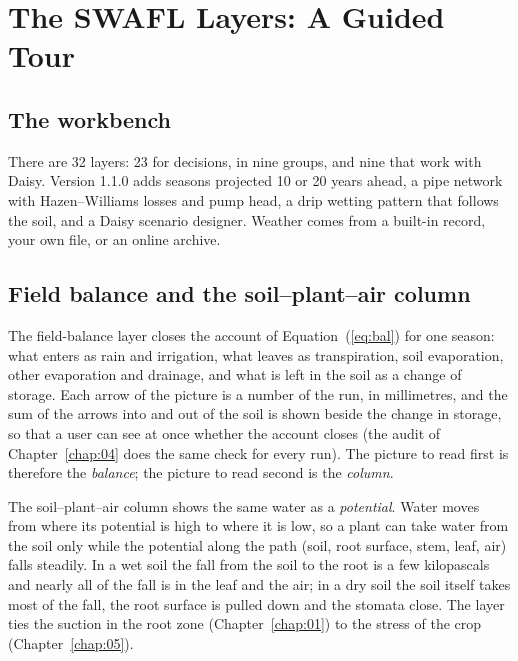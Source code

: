 \chapter{The SWAFL Layers: A Guided Tour}\label{chap:07}
\section{The workbench}
There are 32 layers: 23 for decisions, in nine groups, and nine that work with Daisy. Version 1.1.0 adds seasons projected 10 or 20 years ahead, a pipe network with Hazen--Williams losses and pump head, a drip wetting pattern that follows the soil, and a Daisy scenario designer. Weather comes from a built-in record, your own file, or an online archive.

\section{Field balance and the soil--plant--air column}
The field-balance layer closes the account of Equation~(\ref{eq:bal}) for one season: what enters as rain and irrigation, what leaves as transpiration, soil evaporation, other evaporation and drainage, and what is left in the soil as a change of storage. Each arrow of the picture is a number of the run, in millimetres, and the sum of the arrows into and out of the soil is shown beside the change in storage, so that a user can see at once whether the account closes (the audit of Chapter~\ref{chap:04} does the same check for every run). The picture to read first is therefore the \emph{balance}; the picture to read second is the \emph{column}.

The soil--plant--air column shows the same water as a \emph{potential}. Water moves from where its potential is high to where it is low, so a plant can take water from the soil only while the potential along the path (soil, root surface, stem, leaf, air) falls steadily. In a wet soil the fall from the soil to the root is a few kilopascals and nearly all of the fall is in the leaf and the air; in a dry soil the soil itself takes most of the fall, the root surface is pulled down and the stomata close. The layer ties the suction in the root zone (Chapter~\ref{chap:01}) to the stress of the crop (Chapter~\ref{chap:05}).

